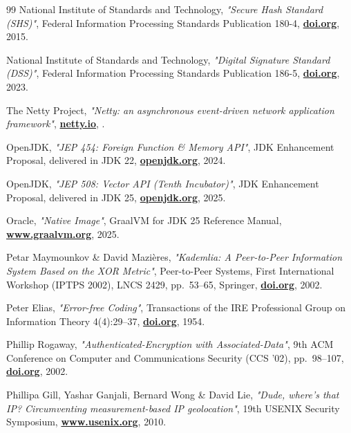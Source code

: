 \documentclass[10pt,a4paper,final]{article}
\let\oldhref\href
\renewcommand{\href}[2]{\oldhref{#1}{\bfseries#2}}
\begin{document}
\begin{thebibliography}{99}
	National Institute of Standards and Technology,
	\emph{"Secure Hash Standard (SHS)"},
	Federal Information Processing Standards Publication 180-4,
	\href{https://doi.org/10.6028/NIST.FIPS.180-4}{doi.org},
	2015.

	National Institute of Standards and Technology,
	\emph{"Digital Signature Standard (DSS)"},
	Federal Information Processing Standards Publication 186-5,
	\href{https://doi.org/10.6028/NIST.FIPS.186-5}{doi.org},
	2023.

	The Netty Project,
	\emph{"Netty: an asynchronous event-driven network application framework"},
	\href{https://netty.io/}{netty.io},
	\the\year{}.

	OpenJDK,
	\emph{"JEP 454: Foreign Function \& Memory API"},
	JDK Enhancement Proposal, delivered in JDK 22,
	\href{https://openjdk.org/jeps/454}{openjdk.org},
	2024.

	OpenJDK,
	\emph{"JEP 508: Vector API (Tenth Incubator)"},
	JDK Enhancement Proposal, delivered in JDK 25,
	\href{https://openjdk.org/jeps/508}{openjdk.org},
	2025.

	Oracle,
	\emph{"Native Image"},
	GraalVM for JDK 25 Reference Manual,
	\href{https://www.graalvm.org/jdk25/reference-manual/native-image/}{www.graalvm.org},
	2025.

	Petar Maymounkov \& David Mazi\`{e}res,
	\emph{"Kademlia: A Peer-to-Peer Information System Based on the XOR Metric"},
	Peer-to-Peer Systems, First International Workshop (IPTPS 2002), LNCS 2429, pp.~53--65, Springer,
	\href{https://doi.org/10.1007/3-540-45748-8_5}{doi.org},
	2002.

	Peter Elias,
	\emph{"Error-free Coding"},
	Transactions of the IRE Professional Group on Information Theory 4(4):29--37,
	\href{https://doi.org/10.1109/TIT.1954.1057464}{doi.org},
	1954.

	Phillip Rogaway,
	\emph{"Authenticated-Encryption with Associated-Data"},
	9th ACM Conference on Computer and Communications Security (CCS '02), pp.~98--107,
	\href{https://doi.org/10.1145/586110.586125}{doi.org},
	2002.

	Phillipa Gill, Yashar Ganjali, Bernard Wong \& David Lie,
	\emph{"Dude, where's that IP? Circumventing measurement-based IP geolocation"},
	19th USENIX Security Symposium,
	\href{https://www.usenix.org/conference/usenixsecurity10/dude-wheres-ip-circumventing-measurement-based-ip-geolocation}{www.usenix.org},
	2010.


\end{thebibliography}
\end{document}
